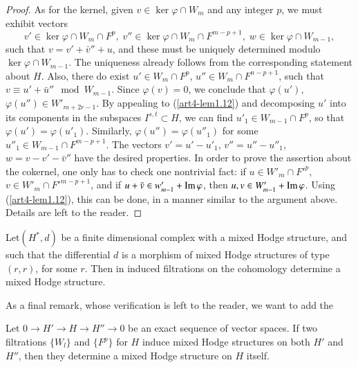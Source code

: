 \begin{proof}
As for the kernel, given $v \in \ker \varphi \cap W_m$ and any integer $p$, we must exhibit vectors
$$
v'\in \ker \varphi \cap W_m \cap F^p, \; v'' \in \ker \varphi \cap W_m \cap F^{m-p+1}, \; w \in \ker \varphi \cap W_{m-1},
$$
such that $v = v' + \bar{v}''+u$, and these must be uniquely determined modulo $\ker \varphi \cap W_{m-1}$. The uniqueness already follows from the corresponding statement about $H$. Also, there do exist $u'\in W_m \cap F^p$, $u'' \in W_m \cap F^{n-p+1}$, such that $v \equiv u' + \bar{u}'' \mod W_{m-1}$. Since $\varphi(v) = 0$, we conclude that $\varphi (u')$, $\varphi (u'') \in W'_{m+2r-1}$. By appealing to (\ref{art4-lem1.12}) and decomposing $u'$ into its components in the subspaces $I^{s,t} \subset H$, we can find $u'_1 \in W_{m-1} \cap F^p$, so that  $\varphi(u') = \varphi(u'_1)$. Similarly, $\varphi (u'') = \varphi (u''_1)$ for some $u''_1 \in W_{m-1} \cap F^{m-p+1}$. The vectors $v'= u'-u'_1$, $v''=u'' - u''_1$, $w = v - v'-\bar{v}''$ have the desired properties. In order to prove the assertion about the cokernel, one only has to check one nontrivial fact: if $u \in W'_m \cap F'^p$, $v \in W'_m \cap F'^{m-p+1}$, and if $u + \bar{v} \in w'_{m-1} +\operatorname{Im} \varphi$, then $u, v\in W'_{m-1} + \operatorname{Im} \varphi$. Using (\ref{art4-lem1.12}), this can be done, in a manner similar to the argument above. Details are left to the reader.
\end{proof}

\begin{coro}\label{art4-coro1.15}
Let\pageoriginale $(H^\ast, d)$ be a finite dimensional complex with a mixed Hodge structure, and such that the differential $d$ is a morphism of mixed Hodge structures of type $(r,r)$, for some $r$. Then in induced filtrations on the cohomology determine a mixed Hodge structure.
\end{coro}

As a final remark, whose verification is left to the reader, we want to add the 

\begin{observation}\label{art4-obser1.16}
Let $0 \to H' \to H \to H'' \to 0$ be an exact sequence of vector spaces. If two filtrations $\{W_l\}$ and $\{F^p\}$ for $H$ induce mixed Hodge structures on both $H'$ and $H''$, then they determine a mixed Hodge structure on $H$ itself.
\end{observation}

